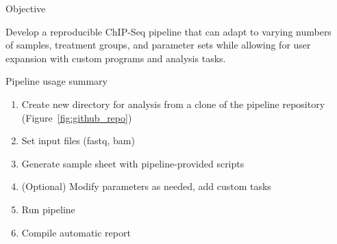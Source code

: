 \documentclass[final]{beamer}
\newlength{\sepwid}
\newlength{\onecolwid}
\begin{document}
\begin{frame}[t] %

\begin{columns}[t] %

\begin{column}{\sepwid}\end{column} %

\begin{column}{\onecolwid} %


\begin{beamerboxesrounded}{Objective}

Develop a reproducible ChIP-Seq pipeline that can adapt to varying numbers of samples, treatment groups, and parameter sets while allowing for user expansion with custom programs and analysis tasks. 

\end{beamerboxesrounded}\hfill

%	


\begin{beamerboxesrounded}{Pipeline usage summary}


\begin{enumerate}
\item Create new directory for analysis from a clone of the pipeline repository (Figure~\ref{fig:github_repo})
\item Set input files (fastq, bam)
\item Generate sample sheet with pipeline-provided scripts
\item (Optional) Modify parameters as needed, add custom tasks
\item Run pipeline
\item Compile automatic report
\end{enumerate}


\end{beamerboxesrounded}
\end{column}
\end{columns}
\end{frame}
\end{document}
